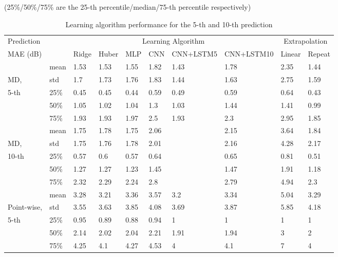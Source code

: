 \begin{table}[t]
	\centering
	\caption{Learning algorithm performance for the 5-th and 10-th prediction}
	(25\%/50\%/75\% are the 25-th percentile/median/75-th percentile respectively)
	\label{tab:ml_tab}
	
	\hspace*{-1.5cm}
	\begin{tabular}{@{}llllllllll@{}}
		\toprule
		Prediction &      &   \multicolumn{6}{c}{Learning Algorithm} &  \multicolumn{2}{c}{Extrapolation}  \\
		\cmidrule(lr){3-8} \cmidrule(lr){9-10}
		\acs{MAE} (dB) &      & Ridge & Huber & \acs{MLP}  & \acs{CNN}  & CNN+LSTM5 & CNN+LSTM10 & Linear & Repeat \\ \midrule
		& mean & 1.53  & 1.53  & 1.55 & 1.82 & 1.43     & 1.78      & 2.35   & 1.44   \\
		MD, & std  & 1.7   & 1.73  & 1.76 & 1.83 & 1.44     & 1.63      & 2.75   & 1.59   \\
		5-th& 25\% & 0.45  & 0.45  & 0.44 & 0.59 & 0.49     & 0.59      & 0.64   & 0.43   \\
		& 50\% & 1.05  & 1.02  & 1.04 & 1.3  & 1.03     & 1.44      & 1.41   & 0.99   \\
		& 75\% & 1.93  & 1.93  & 1.97 & 2.5  & 1.93     & 2.3       & 2.95   & 1.85   \\
		\midrule
		& mean & 1.75  & 1.78  & 1.75 & 2.06 &          & 2.15      & 3.64   & 1.84   \\
		MD, & std  & 1.75  & 1.76  & 1.78 & 2.01 &          & 2.16      & 4.28   & 2.17   \\
		10-th & 25\% & 0.57  & 0.6   & 0.57 & 0.64 &          & 0.65      & 0.81   & 0.51   \\
		& 50\% & 1.27  & 1.27  & 1.23 & 1.45 &          & 1.47      & 1.91   & 1.18   \\
		& 75\% & 2.32  & 2.29  & 2.24 & 2.8  &          & 2.79      & 4.94   & 2.3    \\
		\midrule
		& mean & 3.28  & 3.21  & 3.36 & 3.57 & 3.2      & 3.34      & 5.04   & 3.29   \\
		Point-wise, & std  & 3.55  & 3.63  & 3.85 & 4.08 & 3.69     & 3.87      & 5.85   & 4.18   \\
		5-th& 25\% & 0.95  & 0.89  & 0.88 & 0.94 & 1        & 1         & 1      & 1      \\
		& 50\% & 2.14  & 2.02  & 2.04 & 2.21 & 1.91     & 1.94      & 3      & 2      \\
		& 75\% & 4.25  & 4.1   & 4.27 & 4.53 & 4        & 4.1       & 7      & 4      \\

\end{tabular}
\end{table}
